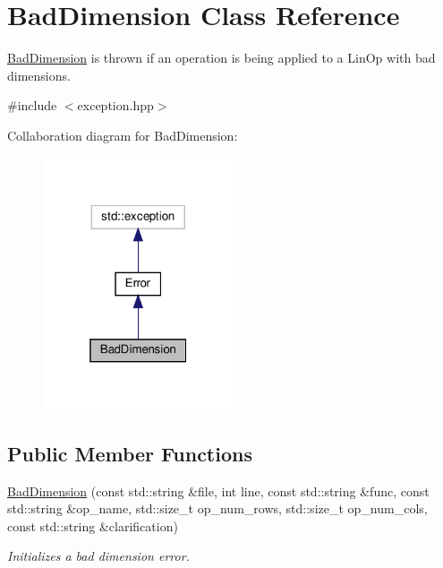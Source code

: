 \hypertarget{classBadDimension}{}\section{Bad\+Dimension Class Reference}
\label{classBadDimension}


\hyperlink{classBadDimension}{Bad\+Dimension} is thrown if an operation is being applied to a Lin\+Op with bad dimensions.  




{\ttfamily \#include $<$exception.\+hpp$>$}



Collaboration diagram for Bad\+Dimension\+:
\nopagebreak
\begin{figure}[H]
\begin{center}
\leavevmode
\includegraphics[width=160pt]{classBadDimension__coll__graph}
\end{center}
\end{figure}
\subsection*{Public Member Functions}
\begin{DoxyCompactItemize}
\item 
\hyperlink{classBadDimension_a4868c7892d3879a155f37daf04b7f8e9}{Bad\+Dimension} (const std\+::string \&file, int line, const std\+::string \&func, const std\+::string \&op\+\_\+name, std\+::size\+\_\+t op\+\_\+num\+\_\+rows, std\+::size\+\_\+t op\+\_\+num\+\_\+cols, const std\+::string \&clarification)
\begin{DoxyCompactList}\small\item\em Initializes a bad dimension error. \end{DoxyCompactList}\end{DoxyCompactItemize}


